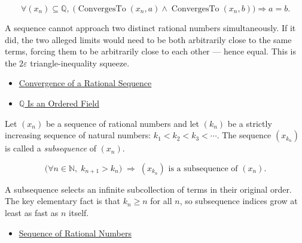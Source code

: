 \begin{remark*}
\[
\forall (x_n) \subseteq \mathbb{Q},\;
\bigl(
\operatorname{ConvergesTo}(x_n, a) \land \operatorname{ConvergesTo}(x_n, b)
\bigr)
\Longrightarrow a = b.
\]
\end{remark*}

\begin{remark*}[Interpretation]
A sequence cannot approach two distinct rational numbers simultaneously.
If it did, the two alleged limits would need to be both arbitrarily close to
the same terms, forcing them to be arbitrarily close to each other --- hence
equal. This is the $2\varepsilon$ triangle-inequality squeeze.
\end{remark*}

\begin{remark*}[Dependencies]
\begin{itemize}
  \item \hyperref[def:convergent-rational-sequence]{Convergence of a Rational Sequence}
  \item \hyperref[thm:q-is-ordered-field]{$\mathbb{Q}$ Is an Ordered Field}
\end{itemize}
\end{remark*}

\begin{definition}
\label{def:subsequence-q}
Let $(x_n)$ be a sequence of rational numbers and let $(k_n)$ be a strictly
increasing sequence of natural numbers:
$k_1 < k_2 < k_3 < \cdots$.
The sequence $(x_{k_n})$ is called a \emph{subsequence} of $(x_n)$.
\end{definition}

\begin{remark*}
\[
\bigl(\forall n \in \mathbb{N},\; k_{n+1} > k_n\bigr)
\;\Longrightarrow\;
(x_{k_n}) \text{ is a subsequence of } (x_n).
\]
\end{remark*}

\begin{remark*}[Interpretation]
A subsequence selects an infinite subcollection of terms in their original
order. The key elementary fact is that $k_n \geq n$ for all $n$, so
subsequence indices grow at least as fast as $n$ itself.
\end{remark*}

\begin{remark*}[Dependencies]
\begin{itemize}
  \item \hyperref[def:rational-sequence]{Sequence of Rational Numbers}
\end{itemize}
\end{remark*}


